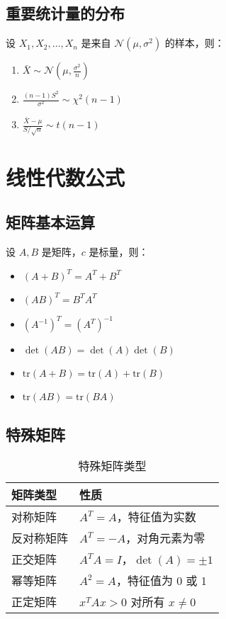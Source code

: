 \subsection{重要统计量的分布}

\begin{definitionbox}[title=抽样分布]
设 $X_1, X_2, \ldots, X_n$ 是来自 $\mathcal{N}(\mu, \sigma^2)$ 的样本，则：
\begin{enumerate}
    \item $\bar{X} \sim \mathcal{N}\left(\mu, \frac{\sigma^2}{n}\right)$
    \item $\frac{(n-1)S^2}{\sigma^2} \sim \chi^2(n-1)$
    \item $\frac{\bar{X} - \mu}{S/\sqrt{n}} \sim t(n-1)$
\end{enumerate}
\end{definitionbox}

\section{线性代数公式}\label{app:linear-algebra}

\subsection{矩阵基本运算}

\begin{infobox}[title=矩阵运算法则]
设 $A, B$ 是矩阵，$c$ 是标量，则：
\begin{itemize}
    \item $(A + B)^T = A^T + B^T$
    \item $(AB)^T = B^T A^T$
    \item $(A^{-1})^T = (A^T)^{-1}$
    \item $\det(AB) = \det(A)\det(B)$
    \item $\text{tr}(A + B) = \text{tr}(A) + \text{tr}(B)$
    \item $\text{tr}(AB) = \text{tr}(BA)$
\end{itemize}
\end{infobox}

\subsection{特殊矩阵}

\begin{table}[htbp]
    \centering
    \caption{特殊矩阵类型}
    \label{tab:special-matrices}
    \begin{tabular}{@{}ll@{}}
        \toprule
        矩阵类型 & 性质 \\
        \midrule
        对称矩阵 & $A^T = A$，特征值为实数 \\
        反对称矩阵 & $A^T = -A$，对角元素为零 \\
        正交矩阵 & $A^T A = I$，$\det(A) = \pm 1$ \\
        幂等矩阵 & $A^2 = A$，特征值为 0 或 1 \\
        正定矩阵 & $x^T A x > 0$ 对所有 $x \neq 0$ \\
        \bottomrule
    \end{tabular}
\end{table}

